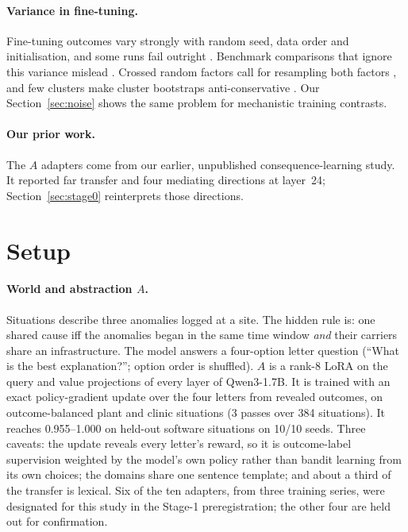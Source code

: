 \documentclass[11pt]{article}
\begin{document}
\paragraph{Variance in fine-tuning.} Fine-tuning outcomes vary strongly with random seed, data order and initialisation, and some runs fail outright \citep{dodge2020,mosbach2021}. Benchmark comparisons that ignore this variance mislead \citep{bouthillier2021}. Crossed random factors call for resampling both factors \citep{owen2007pigeonhole}, and few clusters make cluster bootstraps anti-conservative \citep{cameron2008}. Our Section~\ref{sec:noise} shows the same problem for mechanistic training contrasts.

\paragraph{Our prior work.} The $A$ adapters come from our earlier, unpublished consequence-learning study. It reported far transfer and four mediating directions at layer~24; Section~\ref{sec:stage0} reinterprets those directions.

\section{Setup}\label{sec:setup}

\paragraph{World and abstraction $A$.} Situations describe three anomalies logged at a site. The hidden rule is: one shared cause iff the anomalies began in the same time window \emph{and} their carriers share an infrastructure. The model answers a four-option letter question (``What is the best explanation?''; option order is shuffled). $A$ is a rank-8 LoRA on the query and value projections of every layer of Qwen3-1.7B. It is trained with an exact policy-gradient update over the four letters from revealed outcomes, on outcome-balanced plant and clinic situations (3 passes over 384 situations). It reaches 0.955--1.000 on held-out software situations on 10/10 seeds. Three caveats: the update reveals every letter's reward, so it is outcome-label supervision weighted by the model's own policy rather than bandit learning from its own choices; the domains share one sentence template; and about a third of the transfer is lexical. Six of the ten adapters, from three training series, were designated for this study in the Stage-1 preregistration; the other four are held out for confirmation.
\end{document}
